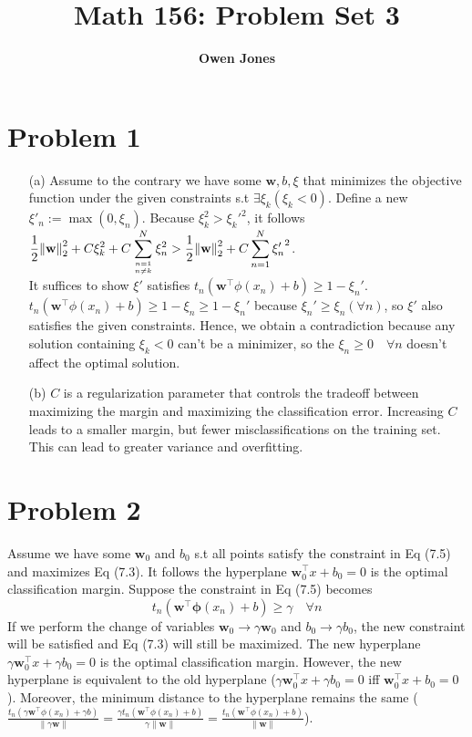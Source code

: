 \documentclass[10pt]{article}
\title{\bf Math 156: Problem Set 3}
\author{\bf Owen Jones}
\begin{document}
\section*{Problem 1}
\begin{itemize}
    \item [(a)] Assume to the contrary we have some $\mathbf{w},b,\xi$ that minimizes the objective function under the given constraints s.t $\exists\xi_k(\xi_k<0)$.
    Define a new $\xi'_n:=\max(0,\xi_n)$. 
    Because $\xi_k^2>{\xi_k'}^2$, it follows\\ 
    $\displaystyle \frac{1}{2}{\lVert \mathbf{w}\rVert}^2_2+C\xi_k^2+C\sum_{n=1\atop n\neq k}^{N}\xi_n^2>\frac{1}{2}{\lVert \mathbf{w}\rVert}^2_2+C\sum_{n=1}^{N}{\xi_n'}^2$.\\
    It suffices to show $\xi'$ satisfies $t_n(\mathbf{w}^\top\phi(x_n)+b)\ge 1-\xi_n'$.\\
    $t_n(\mathbf{w}^\top\phi(x_n)+b)\ge 1-\xi_n\ge 1-\xi_n'$ because $\xi_n'\ge\xi_n(\forall n)$, so $\xi'$ also satisfies the given constraints.
    Hence, we obtain a contradiction because any solution containing $\xi_k<0$ can't be a minimizer, so the $\xi_n\ge0\quad\forall n$ doesn't affect the optimal solution.
    \item [(b)] $C$ is a regularization parameter that controls the tradeoff between maximizing the margin and maximizing the classification error.
    Increasing $C$ leads to a smaller margin, but fewer misclassifications on the training set. This can lead to greater variance and overfitting.
\end{itemize}
\section*{Problem 2}
Assume we have some $\mathbf{w}_0$ and $b_0$ s.t all points satisfy the constraint in Eq (7.5) and maximizes Eq (7.3). 
It follows the hyperplane $\mathbf{w}_0^\top x+b_0=0$ is the optimal classification margin. 
Suppose the constraint in Eq (7.5) becomes 
\begin{equation*}
t_n(\mathbf{w}^\top\mathbf{\phi}(x_n)+b)\ge \gamma\quad\forall n
\end{equation*}  
If we perform the change of variables $\mathbf{w}_0\rightarrow \gamma \mathbf{w}_0$ and $b_0\rightarrow \gamma b_0$, the new constraint will be satisfied and Eq (7.3) will still be maximized.
The new hyperplane $\gamma\mathbf{w}_0^\top x+\gamma b_0=0$ is the optimal classification margin. 
However, the new hyperplane is equivalent to the old hyperplane ($\gamma\mathbf{w}_0^\top x+\gamma b_0=0$ iff $\mathbf{w}_0^\top x+b_0=0$).
Moreover, the minimum distance to the hyperplane remains the same ($\frac{t_n (\gamma\mathbf{w}^\top \phi(x_n)+\gamma b)}{\lVert\gamma\mathbf{w}\rVert}=\frac{\gamma t_n (\mathbf{w}^\top \phi(x_n)+b)}{\gamma\lVert\mathbf{w}\rVert}=\frac{t_n (\mathbf{w}^\top \phi(x_n)+b)}{\lVert\mathbf{w}\rVert}$).
\end{document}
